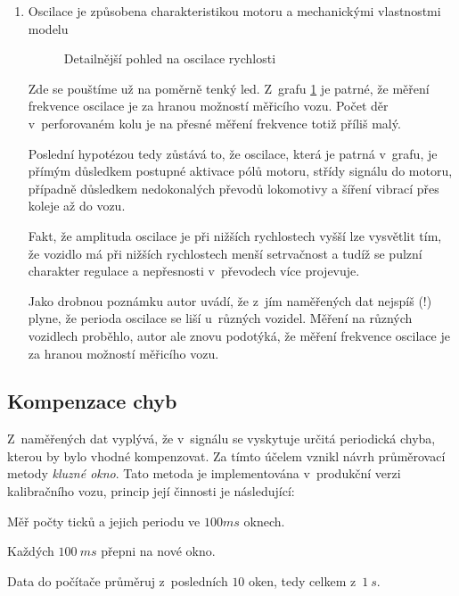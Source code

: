 \begin{enumerate}
\item Oscilace je způsobena charakteristikou motoru a mechanickými vlastnostmi
modelu

\begin{figure}[h]

\caption{Detailnější pohled na oscilace rychlosti}
\label{fig:speed-presny}
\end{figure}

Zde se pouštíme už na poměrně tenký led. Z~grafu \ref{fig:speed-presny} je
patrné, že měření frekvence oscilace je za hranou možností měřicího
vozu. Počet děr v~perforovaném kolu je na přesné měření frekvence totiž příliš
malý.

Poslední hypotézou tedy zůstává to, že oscilace, která je patrná v~grafu,
je přímým důsledkem postupné aktivace pólů motoru, střídy signálu do motoru,
případně důsledkem nedokonalých převodů lokomotivy a šíření vibrací přes
koleje až do vozu.

Fakt, že amplituda oscilace je při nižších rychlostech vyšší lze vysvětlit tím,
že vozidlo má při nižších rychlostech menší setrvačnost a tudíž se pulzní
charakter regulace a nepřesnosti v~převodech více projevuje.

Jako drobnou poznámku autor uvádí, že z~jím naměřených dat nejspíš (!) plyne,
že perioda oscilace se liší u~různých vozidel. Měření na různých vozidlech
proběhlo, autor ale znovu podotýká, že měření frekvence oscilace je za hranou
možností měřicího vozu.

\end{enumerate}

\subsection{Kompenzace chyb}
\label{subsec:wsm-kompenzace}

Z~naměřených dat vyplývá, že v~signálu se vyskytuje určitá periodická chyba,
kterou by bylo vhodné kompenzovat. Za tímto účelem vznikl návrh průměrovací
metody \textit{kluzné okno}. Tato metoda je implementována v~produkční verzi
kalibračního vozu, princip její činnosti je následující:

\begin{compactenum}
\item Měř počty ticků a jejich periodu ve $100ms$ oknech.
\item Každých $100\ ms$ přepni na nové okno.
\item Data do počítače průměruj z~posledních $10$ oken, tedy celkem z~$1\ s$.
\end{compactenum}

